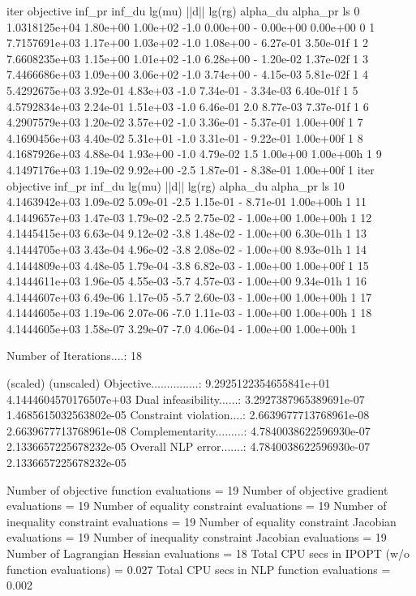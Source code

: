 iter    objective    inf_pr   inf_du lg(mu)  ||d||  lg(rg) alpha_du alpha_pr  ls
   0  1.0318125e+04 1.80e+00 1.00e+02  -1.0 0.00e+00    -  0.00e+00 0.00e+00   0
   1  7.7157691e+03 1.17e+00 1.03e+02  -1.0 1.08e+00    -  6.27e-01 3.50e-01f  1
   2  7.6608235e+03 1.15e+00 1.01e+02  -1.0 6.28e+00    -  1.20e-02 1.37e-02f  1
   3  7.4466686e+03 1.09e+00 3.06e+02  -1.0 3.74e+00    -  4.15e-03 5.81e-02f  1
   4  5.4292675e+03 3.92e-01 4.83e+03  -1.0 7.34e-01    -  3.34e-03 6.40e-01f  1
   5  4.5792834e+03 2.24e-01 1.51e+03  -1.0 6.46e-01   2.0 8.77e-03 7.37e-01f  1
   6  4.2907579e+03 1.20e-02 3.57e+02  -1.0 3.36e-01    -  5.37e-01 1.00e+00f  1
   7  4.1690456e+03 4.40e-02 5.31e+01  -1.0 3.31e-01    -  9.22e-01 1.00e+00f  1
   8  4.1687926e+03 4.88e-04 1.93e+00  -1.0 4.79e-02   1.5 1.00e+00 1.00e+00h  1
   9  4.1497176e+03 1.19e-02 9.92e+00  -2.5 1.87e-01    -  8.38e-01 1.00e+00f  1
iter    objective    inf_pr   inf_du lg(mu)  ||d||  lg(rg) alpha_du alpha_pr  ls
  10  4.1463942e+03 1.09e-02 5.09e-01  -2.5 1.15e-01    -  8.71e-01 1.00e+00h  1
  11  4.1449657e+03 1.47e-03 1.79e-02  -2.5 2.75e-02    -  1.00e+00 1.00e+00h  1
  12  4.1445415e+03 6.63e-04 9.12e-02  -3.8 1.48e-02    -  1.00e+00 6.30e-01h  1
  13  4.1444705e+03 3.43e-04 4.96e-02  -3.8 2.08e-02    -  1.00e+00 8.93e-01h  1
  14  4.1444809e+03 4.48e-05 1.79e-04  -3.8 6.82e-03    -  1.00e+00 1.00e+00f  1
  15  4.1444611e+03 1.96e-05 4.55e-03  -5.7 4.57e-03    -  1.00e+00 9.34e-01h  1
  16  4.1444607e+03 6.49e-06 1.17e-05  -5.7 2.60e-03    -  1.00e+00 1.00e+00h  1
  17  4.1444605e+03 1.19e-06 2.07e-06  -7.0 1.11e-03    -  1.00e+00 1.00e+00h  1
  18  4.1444605e+03 1.58e-07 3.29e-07  -7.0 4.06e-04    -  1.00e+00 1.00e+00h  1

Number of Iterations....: 18

                                   (scaled)                 (unscaled)
Objective...............:   9.2925122354655841e+01    4.1444604570176507e+03
Dual infeasibility......:   3.2927387965389691e-07    1.4685615032563802e-05
Constraint violation....:   2.6639677713768961e-08    2.6639677713768961e-08
Complementarity.........:   4.7840038622596930e-07    2.1336657225678232e-05
Overall NLP error.......:   4.7840038622596930e-07    2.1336657225678232e-05


Number of objective function evaluations             = 19
Number of objective gradient evaluations             = 19
Number of equality constraint evaluations            = 19
Number of inequality constraint evaluations          = 19
Number of equality constraint Jacobian evaluations   = 19
Number of inequality constraint Jacobian evaluations = 19
Number of Lagrangian Hessian evaluations             = 18
Total CPU secs in IPOPT (w/o function evaluations)   =      0.027
Total CPU secs in NLP function evaluations           =      0.002

